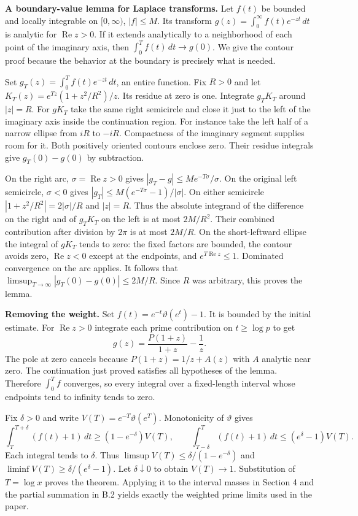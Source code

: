 \documentclass[11pt,a4paper]{article}
\begin{document}
\textbf{A boundary-value lemma for Laplace transforms.} Let \(f(t)\) be bounded and locally integrable on \([0,\infty)\), \(|f|\le M\). Its transform \(g(z)=\int_0^\infty f(t)e^{-zt}\,dt\) is analytic for \(\operatorname{Re}z>0\). If it extends analytically to a neighborhood of each point of the imaginary axis, then \(\int_0^T f(t)\,dt\to g(0)\). We give the contour proof because the behavior at the boundary is precisely what is needed.

Set \(g_T(z)=\int_0^T f(t)e^{-zt}\,dt\), an entire function. Fix \(R>0\) and let \(K_T(z)=e^{Tz}(1+z^2/R^2)/z\). Its residue at zero is one. Integrate \(g_TK_T\) around \(|z|=R\). For \(gK_T\) take the same right semicircle and close it just to the left of the imaginary axis inside the continuation region. For instance take the left half of a narrow ellipse from \(iR\) to \(-iR\). Compactness of the imaginary segment supplies room for it. Both positively oriented contours enclose zero. Their residue integrals give \(g_T(0)-g(0)\) by subtraction.

On the right arc, \(\sigma=\operatorname{Re}z>0\) gives \(|g_T-g|\le M e^{-T\sigma}/\sigma\). On the original left semicircle, \(\sigma<0\) gives \(|g_T|\le M(e^{-T\sigma}-1)/|\sigma|\). On either semicircle \(|1+z^2/R^2|=2|\sigma|/R\) and \(|z|=R\). Thus the absolute integrand of the difference on the right and of \(g_TK_T\) on the left is at most \(2M/R^2\). Their combined contribution after division by \(2\pi\) is at most \(2M/R\). On the short-leftward ellipse the integral of \(gK_T\) tends to zero: the fixed factors are bounded, the contour avoids zero, \(\operatorname{Re}z<0\) except at the endpoints, and \(e^{T\operatorname{Re}z}\le1\). Dominated convergence on the arc applies. It follows that \(\limsup_{T\to\infty}|g_T(0)-g(0)|\le 2M/R\). Since \(R\) was arbitrary, this proves the lemma.

\textbf{Removing the weight.} Set \(f(t)=e^{-t}\vartheta(e^t)-1\). It is bounded by the initial estimate. For \(\operatorname{Re}z>0\) integrate each prime contribution on \(t\ge\log p\) to get \[
 g(z)=\frac{P(1+z)}{1+z}-\frac1z .
\] The pole at zero cancels because \(P(1+z)=1/z+A(z)\) with \(A\) analytic near zero. The continuation just proved satisfies all hypotheses of the lemma. Therefore \(\int_0^T f\) converges, so every integral over a fixed-length interval whose endpoints tend to infinity tends to zero.

Fix \(\delta>0\) and write \(V(T)=e^{-T}\vartheta(e^T)\). Monotonicity of \(\vartheta\) gives \[
 \int_T^{T+\delta}(f(t)+1)\,dt\ge(1-e^{-\delta})V(T),\qquad
 \int_{T-\delta}^T(f(t)+1)\,dt\le(e^\delta-1)V(T).
\] Each integral tends to \(\delta\). Thus \(\limsup V(T)\le\delta/(1-e^{-\delta})\) and \(\liminf V(T)\ge\delta/(e^\delta-1)\). Let \(\delta\downarrow0\) to obtain \(V(T)\to1\). Substitution of \(T=\log x\) proves the theorem. Applying it to the interval masses in Section 4 and the partial summation in B.2 yields exactly the weighted prime limits used in the paper.
\end{document}
